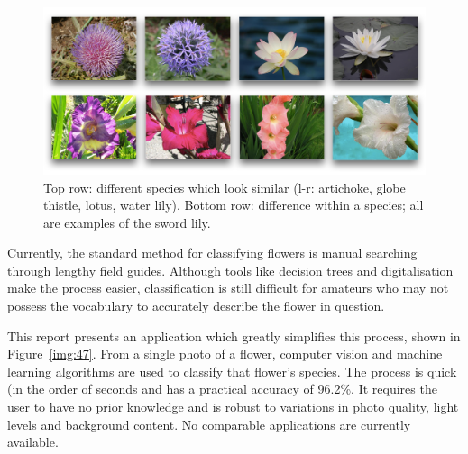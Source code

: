 \documentclass[11pt, a4paper]{report}
\begin{document}
\begin{figure}[hbt]
	\centering
  \includegraphics[totalheight=5cm]{img/33.png}
  \caption{Top row: different species which look similar (l-r: artichoke, globe thistle, lotus, water lily). Bottom row: difference within a species; all are examples of the sword lily.}
  \label{img:33}
\end{figure}

Currently, the standard method for classifying flowers is manual searching through lengthy field guides. Although tools like decision trees and digitalisation make the process easier, classification is still difficult for amateurs who may not possess the vocabulary to accurately describe the flower in question. 

This report presents an application which greatly simplifies this process, shown in Figure~\ref{img:47}. From a single photo of a flower, computer vision and machine learning algorithms are used to classify that flower’s species. The process is quick (in the order of seconds and has a practical accuracy of 96.2\%. It requires the user to have no prior knowledge and is robust to variations in photo quality, light levels and background content. No comparable applications are currently available. 
\end{document}
